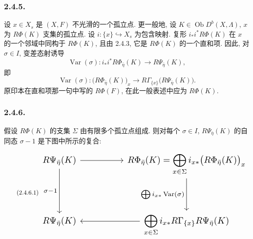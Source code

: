 \subsubsection*{2.4.5.}
设 $x\in X_s$ 是 $(X,F)$ 不光滑的一个孤立点. 更一般地, 设 $K\in\operatorname{Ob}D^b(X,\Lambda)$, $x$ 为 $R\Phi(K)$ 支集的孤立点. 设 $i:\{x\}\hookrightarrow X_s$ 为包含映射. 复形 $i_*i^*R\Phi(K)$ 在 $x$ 的一个邻域中同构于 $R\Phi(K)$, 且由 2.4.3, 它是 $R\Phi(K)$ 的一个直和项. 因此, 对 $\sigma\in I$, 变差态射诱导
\[
\operatorname{Var}(\sigma):
i_*i^*R\Phi_{\bar\eta}(K)\longrightarrow R\Psi_{\bar\eta}(K),
\]
即
\begin{equation}\tag{2.4.5.1}
\operatorname{Var}(\sigma):
\bigl(R\Phi_{\bar\eta}(K)\bigr)_x
\longrightarrow
R\Gamma_{\{x\}}\bigl(R\Psi_{\bar\eta}(K)\bigr).
\end{equation}
原印本在直和项那一句中写的 $R\Phi(F)$, 在此一般表述中应为 $R\Phi(K)$.

\subsubsection*{2.4.6.}
假设 $R\Phi(K)$ 的支集 $\Sigma$ 由有限多个孤立点组成. 则对每个 $\sigma\in I$, $R\Psi_{\bar\eta}(K)$ 的自同态 $\sigma-1$ 是下图中所示的复合:
\begin{equation}\tag{2.4.6.1}
\resizebox{\textwidth}{!}{%
\begin{tikzcd}[ampersand replacement=\&, column sep=huge, row sep=huge]
R\Psi_{\bar\eta}(K)
  \arrow[r] \arrow[d, "\sigma-1"']
  \& R\Phi_{\bar\eta}(K)
     =\displaystyle\bigoplus_{x\in\Sigma}
       i_{x*}\bigl(R\Phi_{\bar\eta}(K)\bigr)_x
     \arrow[d, "{\bigoplus i_{x*}\operatorname{Var}(\sigma)}"'] \\
R\Psi_{\bar\eta}(K)
  \& \displaystyle\bigoplus_{x\in\Sigma}
       i_{x*}R\Gamma_{\{x\}}R\Psi_{\bar\eta}(K)
     \arrow[l]
\end{tikzcd}}
\end{equation}

